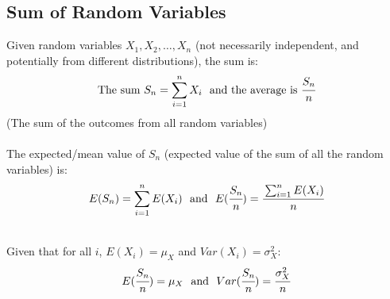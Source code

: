 \documentclass{report}
\begin{document}
        \subsection*{Sum of Random Variables}
            Given random variables $X_1, X_2, \dots, X_n$ (not necessarily independent, and potentially from different distributions), the sum is:
            \[\text{The sum }S_n = \sum_{i=1}^nX_i \ \text{ and the average is } \cfrac{S_n}{n}\]
            (The sum of the outcomes from all random variables)
            \\
            \\ The expected/mean value of $S_n$ (expected value of the sum of all the random variables) is:
            \[E(S_n) = \sum_{i=1}^nE(X_i) \ \text{ and } \ E(\cfrac{S_n}{n}) = \cfrac{\sum_{i=1}^nE(X_i)}{n}\]
            \begin{itemize}
                    \\ Given that for all $i$, $E(X_i) = \mu_X$ and $Var(X_i) = \sigma^2_X$:
                    \[E(\cfrac{S_n}{n}) = \mu_X \ \text{ and } \ Var(\cfrac{S_n}{n}) = \cfrac{\sigma_X^2}{n}\]
            \end{itemize}
    
\end{document}
